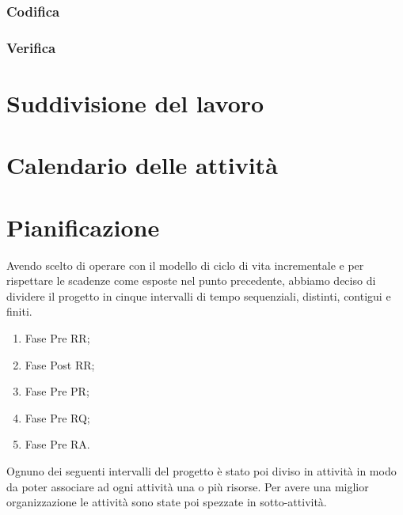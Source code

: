 \subsubsection{Codifica}
\subsubsection{Verifica}


\newpage


\section{Suddivisione del lavoro}


\newpage


\section{Calendario delle attività}


\newpage


\section{Pianificazione}
\label{3.0}
Avendo scelto di operare con il modello di ciclo di vita incrementale e per rispettare le scadenze come esposte nel punto precedente, abbiamo deciso di dividere il progetto in cinque intervalli di tempo sequenziali, distinti, contigui e finiti.

\begin{enumerate}
\item Fase Pre RR;
\item Fase Post RR;
\item Fase Pre PR;
\item Fase Pre RQ;
\item Fase Pre RA.
\end{enumerate}

Ognuno dei seguenti intervalli del progetto è stato poi diviso in attività in modo da poter associare ad ogni attività una o più risorse. Per avere una miglior organizzazione le attività sono state poi spezzate in sotto-attività.



\newpage


\newpage


\newpage


\newpage


